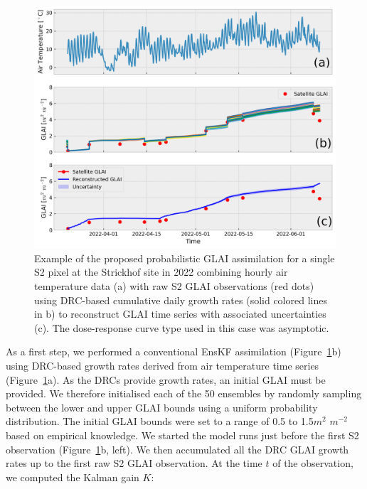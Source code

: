 \begin{figure}[H]
    \centering
    \includegraphics[width=\textwidth]{06-DRC/img/interpolated_lai_5255495.0_475965.0_hourly.png}
    \caption{Example of the proposed probabilistic \gls{GLAI} assimilation for a single \gls{S2} pixel at the Strickhof site in 2022 combining hourly air temperature data (a) with raw \gls{S2} \gls{GLAI} observations (red dots) using \gls{DRC}-based cumulative daily growth rates (solid colored lines in b) to reconstruct \gls{GLAI} time series with associated uncertainties (c). The dose-response curve type used in this case was asymptotic.}
    \label{fig:assimilation-sample-pixel}
\end{figure}

As a first step, we performed a conventional \gls{EnsKF} assimilation (Figure~\ref{fig:assimilation-sample-pixel}b) using \gls{DRC}-based growth rates derived from air temperature time series (Figure~\ref{fig:assimilation-sample-pixel}a). As the \gls{DRC}s provide growth rates, an initial \gls{GLAI} must be provided. We therefore initialised each of the 50 ensembles by randomly sampling between the lower and upper \gls{GLAI} bounds using a uniform probability distribution. The initial \gls{GLAI} bounds were set to a range of 0.5 to 1.5$m^2$ $m^{-2}$ based on empirical knowledge. We started the model runs just before the first \gls{S2} observation (Figure~\ref{fig:assimilation-sample-pixel}b, left). We then accumulated all the \gls{DRC} \gls{GLAI} growth rates up to the first raw \gls{S2} \gls{GLAI} observation. At the time $t$ of the observation, we computed the Kalman gain $K$:

